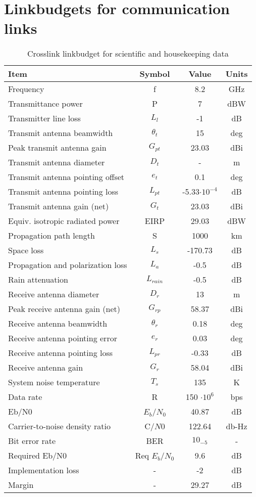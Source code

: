 \chapter{Linkbudgets for communication links}
\label{linkbudgets}

\begin{table}[ht]
\centering
\begin{tabular}{l | c | c | c }
Item & Symbol & Value & Units \\ \hline
Frequency	& f	& 8.2	& GHz \\
Transmittance power	& P	& 7	& dBW \\
Transmitter line loss	& $L_{l}$	& -1	& dB \\
Transmit antenna beamwidth	& $\theta_{t}$	& 15	& deg \\
Peak transmit antenna gain	& $G_{pt}$	& 23.03	& dBi \\
Transmit antenna diameter	& $D_{t}$	& -	& m \\
Transmit antenna pointing offset	& $e_{t}$	& 0.1	& deg \\
Transmit antenna pointing loss	& $L_{pt}$ & -5.33$\cdot 10^{-4}$ & dB \\
Transmit antenna gain (net)	& $G_{t}$	& 23.03	& dBi \\
Equiv. isotropic radiated power	& EIRP	& 29.03	& dBW \\
Propagation path length	& S	& 1000	& km \\
Space loss	& $L_{s}$	& -170.73	& dB \\
Propagation and polarization loss & $L_{a}$ & -0.5 & dB \\
Rain attenuation	& $L_{rain}$	& -0.5	& dB \\
Receive antenna diameter	& $D_{r}$	& 13	& m \\
Peak receive antenna gain (net)	& $G_{rp}$	& 58.37	& dBi \\
Receive antenna beamwidth	& $\theta_{r}$	& 0.18	& deg \\
Receive antenna pointing error	& $e_{r}$	& 0.03	& deg \\
Receive antenna pointing loss	& $L_{pr}$	& -0.33	& dB \\
Receive antenna gain	& $G_{r}$	& 58.04	& dBi \\
System noise temperature	& $T_{s}$	& 135	& K \\
Data rate	& R	& 150 $\cdot10^{6}$	& bps \\
Eb/N0	& $E_{b}$/$N_{0}$	& 40.87	& dB \\
Carrier-to-noise density ratio	& C/$N{0}$	& 122.64	& db-Hz \\
Bit error rate	& BER	& $10_{-5}$	& - \\
Required Eb/N0	& Req $E_{b}$/$N_{0}$	& 9.6	& dB \\
Implementation loss &	-	& -2	& dB \\
Margin	& -	& 29.27	& dB \\
\end{tabular}
\caption{Crosslink linkbudget for scientific and housekeeping data}
\label{figSSbudget}
\end{table}


